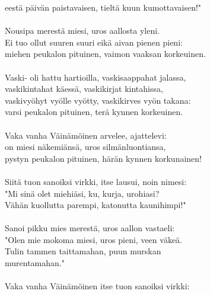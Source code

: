 eestä päivän paistavaisen, tieltä kuun kumottavaisen!"          \\
                                                                \\
Nousipa merestä miesi, uros aallosta yleni.                     \\
Ei tuo ollut suuren suuri eikä aivan pienen pieni:              \\
miehen peukalon pituinen, vaimon vaaksan korkeuinen.            \\
                                                                \\
Vaski- oli hattu hartioilla, vaskisaappahat jalassa,            \\
vaskikintahat käessä, vaskikirjat kintahissa,                   \\
vaskivyöhyt vyölle vyötty, vaskikirves vyön takana:             \\
varsi peukalon pituinen, terä kynnen korkeuinen.                \\
                                                                \\
Vaka vanha Väinämöinen arvelee, ajattelevi:                     \\
on miesi näkemiänsä, uros silmänluontiansa,                     \\
pystyn peukalon pituinen, härän kynnen korkunainen!             \\
                                                                \\
Siitä tuon sanoiksi virkki, itse lausui, noin nimesi:           \\
"Mi sinä olet miehiäsi, ku, kurja, urohiasi?                    \\
Vähän kuollutta parempi, katonutta kaunihimpi!"                 \\
                                                                \\
Sanoi pikku mies merestä, uros aallon vastaeli:                 \\
"Olen mie mokoma miesi, uros pieni, veen väkeä.                 \\
Tulin tammen taittamahan, puun murskan                          \\
murentamahan."                                                  \\
                                                                \\
Vaka vanha Väinämöinen itse tuon sanoiksi virkki:               \\
